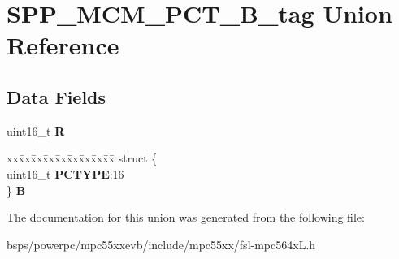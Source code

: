 \hypertarget{unionSPP__MCM__PCT__16B__tag}{}\section{S\+P\+P\+\_\+\+M\+C\+M\+\_\+\+P\+C\+T\+\_\+B\+\_\+tag Union Reference}
\label{unionSPP__MCM__PCT__16B__tag}
\subsection*{Data Fields}
\begin{DoxyCompactItemize}
\item 
\mbox{\label{unionSPP__MCM__PCT__16B__tag_a9261980e9c553aa1c5ba2bd5efce4cfa}} 
uint16\+\_\+t {\bfseries R}
\item 
\mbox{\label{unionSPP__MCM__PCT__16B__tag_a11c7e20d14edfdc62ee345b0963a7dcb}} 
\begin{tabbing}
xx\=xx\=xx\=xx\=xx\=xx\=xx\=xx\=xx\=\kill
struct \{\\
\>uint16\_t {\bfseries PCTYPE}:16\\
\} {\bfseries B}\\

\end{tabbing}\end{DoxyCompactItemize}


The documentation for this union was generated from the following file\+:\begin{DoxyCompactItemize}
\item 
bsps/powerpc/mpc55xxevb/include/mpc55xx/fsl-\/mpc564x\+L.\+h\end{DoxyCompactItemize}
